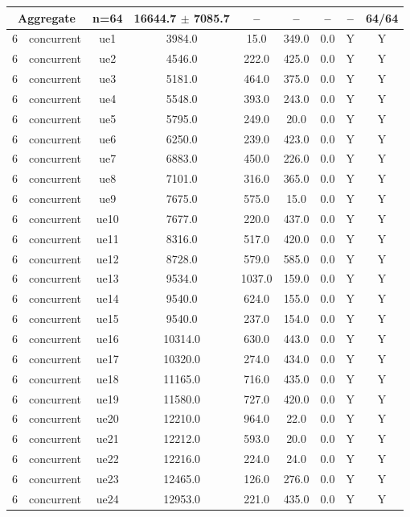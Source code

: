 \begin{table}[ht]
\begin{tabular}{|c|c|c|c|c|c|c|c|c|}
\multicolumn{2}{|c|}{\textbf{Aggregate}} & n=64 & 16644.7 $\pm$ 7085.7 & -- & -- & -- & -- & 64/64 \\
\hline
6 & concurrent & ue1 & 3984.0 & 15.0 & 349.0 & 0.0 & Y & Y \\
6 & concurrent & ue2 & 4546.0 & 222.0 & 425.0 & 0.0 & Y & Y \\
6 & concurrent & ue3 & 5181.0 & 464.0 & 375.0 & 0.0 & Y & Y \\
6 & concurrent & ue4 & 5548.0 & 393.0 & 243.0 & 0.0 & Y & Y \\
6 & concurrent & ue5 & 5795.0 & 249.0 & 20.0 & 0.0 & Y & Y \\
6 & concurrent & ue6 & 6250.0 & 239.0 & 423.0 & 0.0 & Y & Y \\
6 & concurrent & ue7 & 6883.0 & 450.0 & 226.0 & 0.0 & Y & Y \\
6 & concurrent & ue8 & 7101.0 & 316.0 & 365.0 & 0.0 & Y & Y \\
6 & concurrent & ue9 & 7675.0 & 575.0 & 15.0 & 0.0 & Y & Y \\
6 & concurrent & ue10 & 7677.0 & 220.0 & 437.0 & 0.0 & Y & Y \\
6 & concurrent & ue11 & 8316.0 & 517.0 & 420.0 & 0.0 & Y & Y \\
6 & concurrent & ue12 & 8728.0 & 579.0 & 585.0 & 0.0 & Y & Y \\
6 & concurrent & ue13 & 9534.0 & 1037.0 & 159.0 & 0.0 & Y & Y \\
6 & concurrent & ue14 & 9540.0 & 624.0 & 155.0 & 0.0 & Y & Y \\
6 & concurrent & ue15 & 9540.0 & 237.0 & 154.0 & 0.0 & Y & Y \\
6 & concurrent & ue16 & 10314.0 & 630.0 & 443.0 & 0.0 & Y & Y \\
6 & concurrent & ue17 & 10320.0 & 274.0 & 434.0 & 0.0 & Y & Y \\
6 & concurrent & ue18 & 11165.0 & 716.0 & 435.0 & 0.0 & Y & Y \\
6 & concurrent & ue19 & 11580.0 & 727.0 & 420.0 & 0.0 & Y & Y \\
6 & concurrent & ue20 & 12210.0 & 964.0 & 22.0 & 0.0 & Y & Y \\
6 & concurrent & ue21 & 12212.0 & 593.0 & 20.0 & 0.0 & Y & Y \\
6 & concurrent & ue22 & 12216.0 & 224.0 & 24.0 & 0.0 & Y & Y \\
6 & concurrent & ue23 & 12465.0 & 126.0 & 276.0 & 0.0 & Y & Y \\
6 & concurrent & ue24 & 12953.0 & 221.0 & 435.0 & 0.0 & Y & Y \\

\end{tabular}
\end{table}
